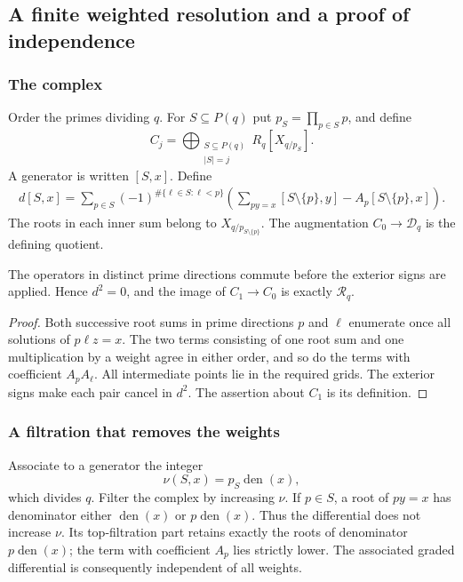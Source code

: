 \subsection{A finite weighted resolution and a proof of independence}
\label{ir:sec:resolution}

\subsubsection{The complex}
Order the primes dividing $q$. For $S\subseteq P(q)$ put
$p_S=\prod_{p\in S}p$, and define
\begin{equation}\label{ir:eq:chain-groups}
 C_j=\bigoplus_{\substack{S\subseteq P(q)\\|S|=j}}
       R_q[X_{q/p_S}].
\end{equation}
A generator is written $[S,x]$. Define
\begin{align}
 d[S,x]=\sum_{p\in S}(-1)^{\#\{\ell\in S:\ell<p\}}
 \left(\sum_{py=x}[S\setminus\{p\},y]
       -A_p[S\setminus\{p\},x]\right).
 \label{ir:eq:chain-differential}
\end{align}
The roots in each inner sum belong to $X_{q/p_{S\setminus\{p\}}}$.
The augmentation $C_0\to\mathcal D_q$ is the defining quotient.

\begin{lemma}\label{ir:lem:complex}
The operators in distinct prime directions commute before the exterior
signs are applied. Hence $d^2=0$, and the image of $C_1\to C_0$ is
exactly $\mathcal R_q$.
\end{lemma}
\begin{proof}
Both successive root sums in prime directions $p$ and $\ell$ enumerate
once all solutions of $p\ell z=x$. The two terms consisting of one
root sum and one multiplication by a weight agree in either order,
and so do the terms with coefficient $A_pA_\ell$. All intermediate
points lie in the required grids. The exterior signs make each pair
cancel in $d^2$. The assertion about $C_1$ is its definition.
\end{proof}

\subsubsection{A filtration that removes the weights}
Associate to a generator the integer
\begin{equation}\label{ir:eq:augmented-conductor}
 \nu(S,x)=p_S\operatorname{den}(x),
\end{equation}
which divides $q$. Filter the complex by increasing $\nu$.
If $p\in S$, a root of $py=x$ has denominator either
$\operatorname{den}(x)$ or $p\operatorname{den}(x)$. Thus the differential does not increase
$\nu$. Its top-filtration part retains exactly the roots of denominator
$p\operatorname{den}(x)$; the term with coefficient $A_p$ lies strictly lower.
The associated graded differential is consequently independent of all
weights.

